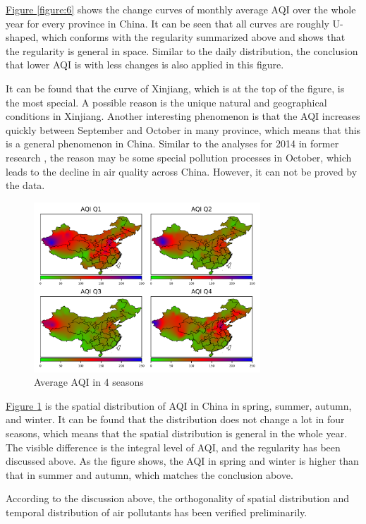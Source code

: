 \documentclass[letterpaper]{article}
\begin{document}
\begin{CJK*}{UTF8}{gkai}
  \hyperref[figure:6]{Figure \ref*{figure:6}} shows the change curves of monthly average AQI over the whole year for every province in China. It can be seen that all curves are roughly U-shaped, which conforms with the regularity summarized above and shows that the regularity is general in space. Similar to the daily distribution, the conclusion that lower AQI is with less changes is also applied in this figure.

  It can be found that the curve of Xinjiang, which is at the top of the figure, is the most special. A possible reason is the unique natural and geographical conditions in Xinjiang. Another interesting phenomenon is that the AQI increases quickly between September and October in many province, which means that this is a general phenomenon in China. Similar to the analyses for 2014 in former research , the reason may be some special pollution processes in October, which leads to the decline in air quality across China. However, it can not be proved by the data.

  \begin{figure}[h]
    \includegraphics[width = 8.5cm]{AQI_season.png}
    \caption{Average AQI in 4 seasons}
    \label{figure:7}
  \end{figure}

  \hyperref[figure:7]{Figure \ref*{figure:7}} is the spatial distribution of AQI in China in spring, summer, autumn, and winter. It can be found that the distribution does not change a lot in four seasons, which means that the spatial distribution is general in the whole year. The visible difference is the integral level of AQI, and the regularity has been discussed above. As the figure shows, the AQI in spring and winter is higher than that in summer and autumn, which matches the conclusion above.

  According to the discussion above, the orthogonality of spatial distribution and temporal distribution of air pollutants has been verified preliminarily.


\end{CJK*}
\end{document}
